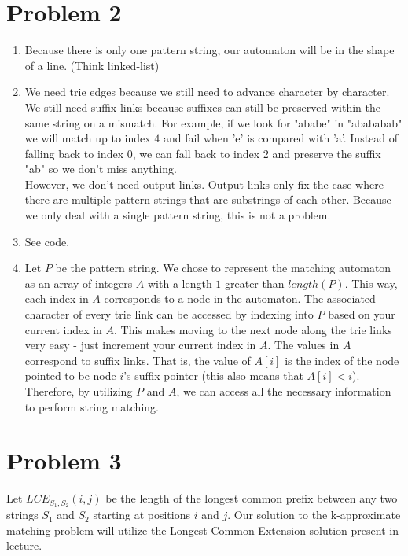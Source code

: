 \documentclass{article}
\theoremstyle{casestyle}
\begin{document}
\section *{Problem 2}
\begin{enumerate}[i]
    \item 
    Because there is only one pattern string, our automaton will be in the shape of a line. (Think linked-list)

    \item 
    We need trie edges because we still need to advance character by character. We still need suffix links because suffixes can still be preserved within the same string on a mismatch. For example, if we look for "ababe" in "abababab" we will match up to index $4$ and fail when 'e' is compared with 'a'. Instead of falling back to index $0$, we can fall back to index $2$ and preserve the suffix "ab" so we don't miss anything.\\
    
    However, we don't need output links. Output links only fix the case where there are multiple pattern strings that are substrings of each other. Because we only deal with a single pattern string, this is not a problem.\\
    
    \item 
    See code.
    
    \item 
    Let $P$ be the pattern string. We chose to represent the matching automaton as an array of integers $A$ with a length $1$ greater than $length(P)$. This way, each index in $A$ corresponds to a node in the automaton. The associated character of every trie link can be accessed by indexing into $P$ based on your current index in $A$. This makes moving to the next node along the trie links very easy - just increment your current index in $A$. The values in $A$ correspond to suffix links. That is, the value of $A[i]$ is the index of the node pointed to be node $i$'s suffix pointer (this also means that $A[i] < i$). Therefore, by utilizing $P$ and $A$, we can access all the necessary information to perform string matching.\\
    
    
\end{enumerate}


\section *{Problem 3}
Let $LCE_{S_1, S_2}(i, j)$ be the length of the longest common prefix between any two strings $S_1$ and $S_2$ starting at positions $i$ and $j$. Our solution to the k-approximate matching problem will utilize the Longest Common Extension solution present in lecture.\\
\end{document}

